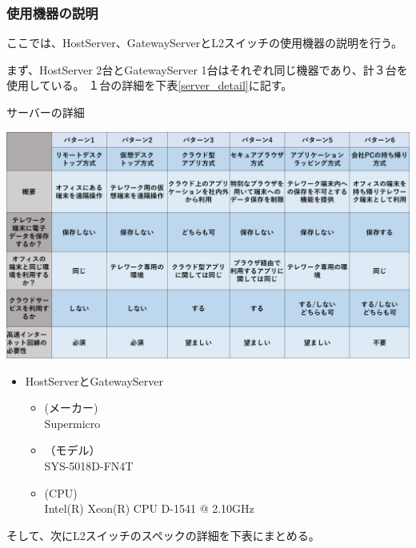\documentclass[11pt,a4j,titlepage]{jreport}
\begin{document}
\subsubsection{使用機器の説明}
ここでは、HostServer、GatewayServerとL2スイッチの使用機器の説明を行う。\par
まず、HostServer 2台とGatewayServer 1台はそれぞれ同じ機器であり、計３台を使用している。
１台の詳細を下表\ref{server_detail}に記す。

\begin{table}[H]
    \centering
    \caption{サーバーの詳細}
    \includegraphics*[width=1.0\textwidth,page=6]{graphs/telework_list.pdf}
    \label{server_detail}
\end{table}


\begin{itemize}
    \setlength{\parskip}{0.05cm} %
    \setlength{\itemsep}{0.05cm}
    \item HostServerとGatewayServer\mbox{}
    \begin{itemize}
        \item (メーカー)\mbox{}\\Supermicro
        \item （モデル）\mbox{}\\SYS-5018D-FN4T
        \item (CPU)\mbox{} \\
            Intel(R) Xeon(R) CPU D-1541 @ 2.10GHz
    \end{itemize}
    
\end{itemize}
\fi
そして、次にL2スイッチのスペックの詳細を下表にまとめる。
\end{document}
